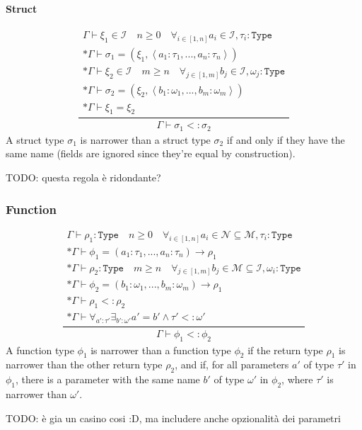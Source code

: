 \documentclass[11pt]{report}
\newcommand{\infrule}[3][gathered]{\frac{\begin{#1}#2\end{#1}}{\begin{gathered}#3\end{gathered}}}
\newcommand{\then}{\vdash}
\newcommand{\tuple}[1]{\left<#1\right>}
\newcommand{\narr}{<:}
\newcommand{\Id}{\mathcal{I}}
\newcommand{\Type}{\texttt{Type}}
\newcommand{\Env}{\Gamma}
\theoremstyle{definition}
\newcommand{\comment}[1]{
	\parbox{0.9\linewidth}{\color{black!30}\small\sffamily #1}
}
\begin{document}
\paragraph{Struct}

\[
	\infrule{
		\Env\then \xi_1 \in \Id \quad n \geq 0 \quad \forall_{i\in[1,n]}{a_i \in \Id, \tau_i:\Type} \\*
		\Env\then \sigma_1 = (\xi_1, \tuple{a_1:\tau_1,...,a_n:\tau_n}) \\*
		\Env\then \xi_2 \in \Id \quad m \geq n \quad \forall_{j\in[1,m]}{b_j \in \Id, \omega_j:\Type} \\*
		\Env\then \sigma_2 = (\xi_2, \tuple{b_1:\omega_1,...,b_m:\omega_m}) \\*
		\Env\then \xi_1 = \xi_2
	}{
		\Env\then \sigma_1 \narr \sigma_2
	}
\]
A struct type $\sigma_1$ is narrower than a struct type $\sigma_2$ if and only
if they have the same name (fields are ignored since they're equal by
construction).

\comment{TODO: questa regola è ridondante?}
\vspace{\baselineskip}

\newpage

\subsubsection{Function}

\[
	\infrule{
		\Env\then \rho_1:\Type \quad n \geq 0 \quad \forall_{i\in[1,n]}{a_i \in \mathcal{N} \subseteq \mathcal{M}, \tau_i:\Type} \\*
		\Env\then \phi_1 = (a_1:\tau_1,...,a_n:\tau_n) \to \rho_1 \\*
		\Env\then \rho_2:\Type \quad m \geq n  \quad \forall_{j\in[1,m]}{b_j \in \mathcal{M} \subseteq \Id, \omega_i:\Type} \\*
		\Env\then \phi_2 = (b_1:\omega_1,...,b_m:\omega_m) \to \rho_1 \\*
		\Env\then \rho_1 \narr \rho_2 \\*
		\Env\then \forall_{a':\tau'}{\exists_{b':\omega'}{a'=b' \land \tau' \narr \omega'}}
	}{
		\Env\then \phi_1 \narr \phi_2
	}
\]
A function type $\phi_1$ is narrower than a function type $\phi_2$ if the
return type $\rho_1$ is narrower than the other return type $\rho_2$, and if,
for all parameters $a'$ of type $\tau'$ in $\phi_1$, there is a parameter with
the same name $b'$ of type $\omega'$ in $\phi_2$, where $\tau'$ is narrower
than $\omega'$.

\comment{TODO: è gia un casino cosi :D, ma includere anche opzionalità dei parametri}
\end{document}

